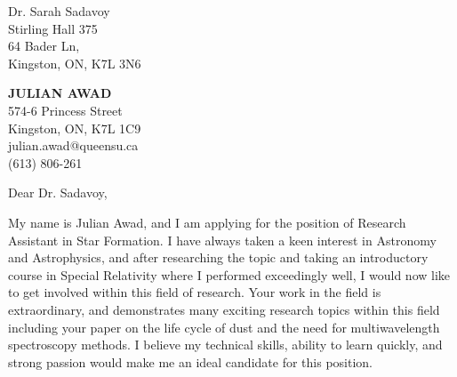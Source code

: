 \documentclass[11pt]{letter} %
\begin{document}
\begin{letter}{Dr. Sarah Sadavoy \\
Stirling Hall 375 \\
64 Bader Ln, \\
Kingston, ON, K7L 3N6}

\begin{center}
\textbf{\huge JULIAN AWAD} \\ %
\vspace{1em} %
574-6 Princess Street \\ Kingston, ON, K7L 1C9 \\ julian.awad@queensu.ca \\ (613) 806-261 %
\end{center}
\hspace{2em}
\signature{Julian Awad} %
\vspace{-0.3in}
\opening{Dear Dr. Sadavoy,}

My name is Julian Awad, and I am applying for the position of Research Assistant in Star Formation. I have always taken a keen interest in Astronomy and Astrophysics, and after researching the topic and taking an introductory course in Special Relativity where I performed exceedingly well, I would now like to get involved within this field of research. Your work in the field is extraordinary, and demonstrates many exciting research topics within this field including your paper on the life cycle of dust and the need for multiwavelength spectroscopy methods. I believe my technical skills, ability to learn quickly, and strong passion would make me an ideal candidate for this position.



\end{letter}
\end{document}
